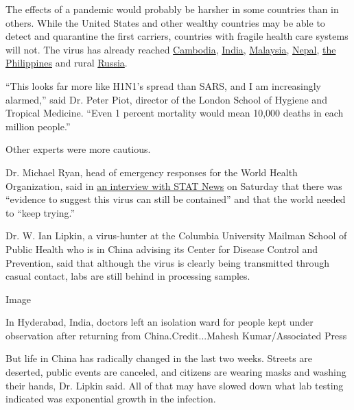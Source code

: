 The effects of a pandemic would probably be harsher in some countries
than in others. While the United States and other wealthy countries may
be able to detect and quarantine the first carriers, countries with
fragile health care systems will not. The virus has already reached
\href{https://www.phnompenhpost.com/national/first-case-coronavirus-reported-kingdom}{Cambodia},
\href{https://qz.com/india/1793841/indias-first-confirmed-case-of-coronavirus-reported-in-kerala/}{India},
\href{https://www.thestar.com.my/news/nation/2020/01/30/coronavirus-eighth-positive-case-in-m039sia-confirmed-thursday-jan-30}{Malaysia},
\href{https://www.reuters.com/article/us-china-health-nepal/nepal-confirms-first-case-of-new-coronavirus-idUSKBN1ZN1S2}{Nepal},
\href{https://www.reuters.com/article/us-china-health-philippines/philippines-confirms-first-case-of-new-coronavirus-health-minister-idUSKBN1ZT0S0}{the
Philippines} and rural
\href{https://www.themoscowtimes.com/2020/01/31/russia-reports-first-coronavirus-cases-a69123}{Russia}.

``This looks far more like H1N1's spread than SARS, and I am
increasingly alarmed,'' said Dr. Peter Piot, director of the London
School of Hygiene and Tropical Medicine. ``Even 1 percent mortality
would mean 10,000 deaths in each million people.''

Other experts were more cautious.

Dr. Michael Ryan, head of emergency responses for the World Health
Organization, said in
\href{https://www.statnews.com/2020/02/01/top-who-official-says-not-too-late-to-stop-coronavirus-outbreak/}{an
interview with STAT News} on Saturday that there was ``evidence to
suggest this virus can still be contained'' and that the world needed to
``keep trying.''

Dr. W. Ian Lipkin, a virus-hunter at the Columbia University Mailman
School of Public Health who is in China advising its Center for Disease
Control and Prevention, said that although the virus is clearly being
transmitted through casual contact, labs are still behind in processing
samples.

Image

In Hyderabad, India, doctors left an isolation ward for people kept
under observation after returning from China.Credit...Mahesh
Kumar/Associated Press

But life in China has radically changed in the last two weeks. Streets
are deserted, public events are canceled, and citizens are wearing masks
and washing their hands, Dr. Lipkin said. All of that may have slowed
down what lab testing indicated was exponential growth in the infection.

